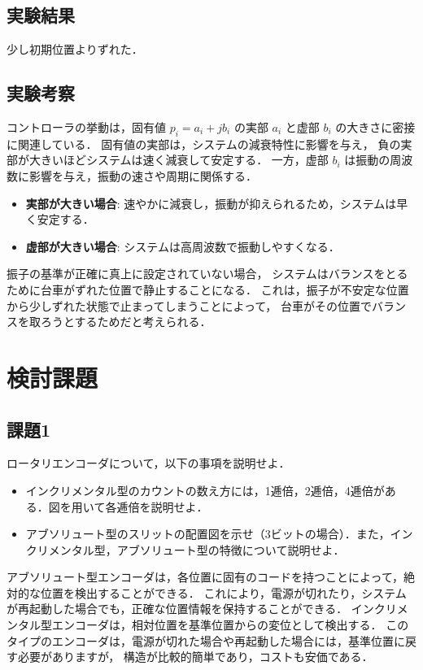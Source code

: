 \subsection{実験結果}
少し初期位置よりずれた．

\subsection{実験考察}
コントローラの挙動は，固有値 \( p_i = a_i + jb_i \) の実部 \( a_i \) と虚部 \( b_i \) 
の大きさに密接に関連している．
固有値の実部は，システムの減衰特性に影響を与え，
負の実部が大きいほどシステムは速く減衰して安定する．
一方，虚部 \( b_i \) は振動の周波数に影響を与え，振動の速さや周期に関係する．

\begin{itemize}
  \item \textbf{実部が大きい場合}: 速やかに減衰し，振動が抑えられるため，システムは早く安定する．
  \item \textbf{虚部が大きい場合}: システムは高周波数で振動しやすくなる．
\end{itemize}

振子の基準が正確に真上に設定されていない場合，
システムはバランスをとるために台車がずれた位置で静止することになる．
これは，振子が不安定な位置から少しずれた状態で止まってしまうことによって，
台車がその位置でバランスを取ろうとするためだと考えられる．

\section{検討課題}

\subsection*{課題1}
ロータリエンコーダについて，以下の事項を説明せよ．
\begin{itemize}
  \item インクリメンタル型のカウントの数え方には，1逓倍，2逓倍，4逓倍がある．図を用いて各逓倍を説明せよ．
  \item アブソリュート型のスリットの配置図を示せ（3ビットの場合）．また，インクリメンタル型，アブソリュート型の特徴について説明せよ．
\end{itemize}

アブソリュート型エンコーダは，各位置に固有のコードを持つことによって，絶対的な位置を検出することができる．
これにより，電源が切れたり，システムが再起動した場合でも，正確な位置情報を保持することができる．
インクリメンタル型エンコーダは，相対位置を基準位置からの変位として検出する．
このタイプのエンコーダは，電源が切れた場合や再起動した場合には，基準位置に戻す必要がありますが，
構造が比較的簡単であり，コストも安価である．


